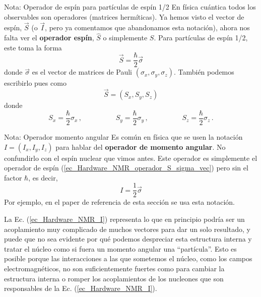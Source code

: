 	\begin{mybox_blue}{Nota: Operador de espín para partículas de espín 1/2}
	En física cuántica todos los observables son operadores (matrices hermíticas). Ya hemos visto 
	el vector de espín, $\vec{S}$ (o $\vec{I}$, pero ya comentamos que abandonamos esta notación),
	ahora nos falta ver el \textbf{operador espín},	$\hat{S}$ o simplemente $S$. Para partículas de 
	espín 1/2, este toma la forma
		\begin{equation} \label{ec_Hardware_NMR_operador_S_sigma_vec}
		\boxed{\vec{S} = \frac{\hbar}{2} \vec{\sigma}}
		\end{equation}
	donde $\vec{\sigma}$ es el vector de matrices de Pauli $(\sigma_x, \sigma_y, \sigma_z)$.
	También podemos escribirlo pues como
		\begin{equation} \label{ec_Hardware_NMR_operador_S_vec_Sx-Sy-Sz}
		\vec{S} = (S_x, S_y, S_z)
		\end{equation}
	donde 
		\begin{equation} \label{ec_Hardware_NMR_Sx-Sy-Sz}
		\boxed{S_x = \frac{\hbar}{2} \sigma_x} \, , \hspace{2cm} 
		\boxed{S_y = \frac{\hbar}{2} \sigma_y} \, , \hspace{2cm} 
		\boxed{S_z = \frac{\hbar}{2} \sigma_z} \, .
		\end{equation}
	\end{mybox_blue}
	
	\begin{mybox_blue}{Nota: Operador momento angular}
	Es común en física que se usen la notación $I = (I_x, I_y, I_z)$ para hablar del 
	\textbf{operador de momento angular}. No confundirlo con el espín nuclear que vimos
	antes. Este operador es simplemente el operador de espín (\ref{ec_Hardware_NMR_operador_S_sigma_vec})
	pero sin el factor $\hbar$, es decir,
		\begin{equation} 
		I = \frac{1}{2} \vec{\sigma}
		\end{equation}
	Por ejemplo, en el paper de referencia de esta sección \cite{bib_NMR_hardware} se usa esta notación. 
	\end{mybox_blue}

La Ec. (\ref{ec_Hardware_NMR_I}) representa lo que en principio podría ser un acoplamiento muy complicado de muchos vectores para dar un solo resultado, y puede que no sea evidente por qué podemos despreciar esta estructura interna y tratar el núcleo como si fuera un momento angular una ``partícula''. Esto es posible porque las interacciones a las que sometemos el núcleo, como los campos electromagnéticos, no son suficientemente fuertes como para cambiar la estructura interna o romper los acoplamientos de los nucleones que son responsables de la Ec. (\ref{ec_Hardware_NMR_I}). 

